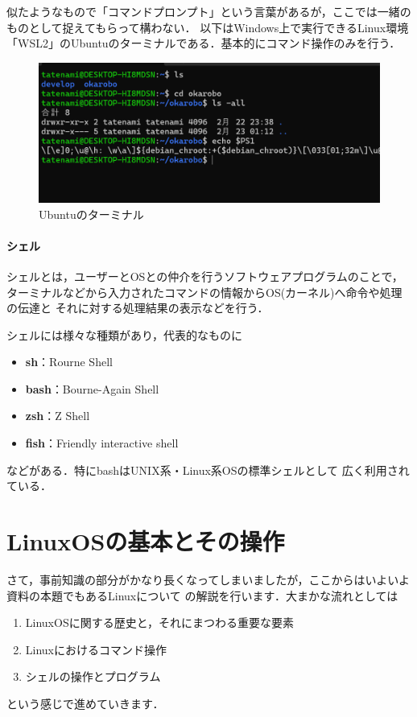 \documentclass[autodetect-engine,dvi=dvipdfmx,ja=standard,a4j]{bxjsarticle}
\begin{document}
似たようなもので「コマンドプロンプト」という言葉があるが，ここでは一緒のものとして捉えてもらって構わない．
以下はWindows上で実行できるLinux環境「WSL2」のUbuntuのターミナルである．基本的にコマンド操作のみを行う．

\begin{figure}[H]
    \centering
    \includegraphics[width=150mm]{image/Terinal.png}
    \caption{Ubuntuのターミナル}
    \label{fig:Terminal}
\end{figure}

\subsection{シェル}
シェルとは，ユーザーとOSとの仲介を行うソフトウェアプログラムのことで，
ターミナルなどから入力されたコマンドの情報からOS(カーネル)へ命令や処理の伝達と
それに対する処理結果の表示などを行う．

シェルには様々な種類があり，代表的なものに
\begin{itemize}
    \item \textbf{sh}：Rourne Shell
    \item \textbf{bash}：Bourne-Again Shell
    \item \textbf{zsh}：Z Shell
    \item \textbf{fish}：Friendly interactive shell
\end{itemize}
などがある．特にbashはUNIX系・Linux系OSの標準シェルとして
広く利用されている．


\clearpage
\part{LinuxOSの基本とその操作} \label{part:Linux}
さて，事前知識の部分がかなり長くなってしまいましたが，ここからはいよいよ資料の本題でもあるLinuxについて
の解説を行います．大まかな流れとしては
\begin{enumerate}
    \item LinuxOSに関する歴史と，それにまつわる重要な要素
    \item Linuxにおけるコマンド操作
    \item シェルの操作とプログラム
\end{enumerate}
という感じで進めていきます．
\end{document}
